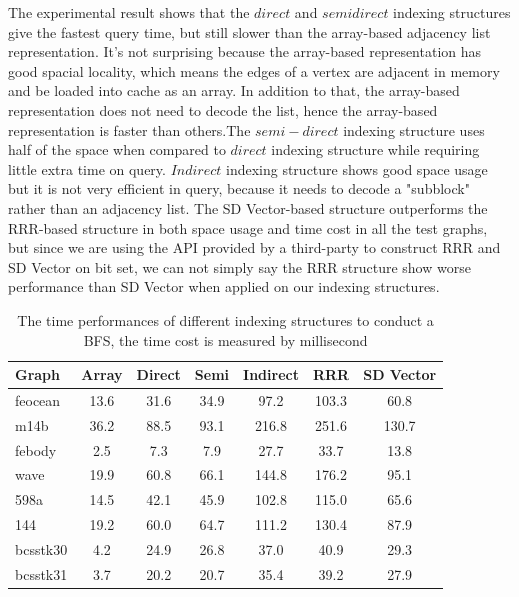 \documentclass[12pt,glossary]{dalthesis}
\begin{document}
The experimental result shows that the $direct$ and $semi direct$ indexing structures give the fastest query time, but still slower than the array-based adjacency list representation. It's not surprising because the array-based representation has good spacial locality, which means the edges of a vertex are adjacent in memory and be loaded into cache as an array. In addition to that, the array-based representation does not need to decode the list, hence the array-based representation is faster than others.The $semi-direct$ indexing structure uses half of the space when compared to $direct$ indexing structure while requiring little extra time on query. $Indirect$ indexing structure shows good space usage but it is not very efficient in query, because it needs to decode a "subblock" rather than an adjacency list. The SD Vector-based structure outperforms the RRR-based structure in both space usage and time cost in all the test graphs, but since we are using the API provided by a third-party to construct RRR and SD Vector on bit set, we can not simply say the RRR structure show worse performance than SD Vector when applied on our indexing structures.     

\bigskip

\begin{table}[ht]
\centering
\caption{The time performances of different indexing structures to conduct a BFS, the time cost is measured by millisecond}
\label{my-label}
\begin{tabular}{|l||c||c||c||c||c||c|}
\hline
Graph    & Array & Direct & Semi & Indirect & RRR & SD Vector \\ \hline
feocean  &   13.6    &   31.6     &   34.9   &    97.2      &  103.3   & 60.8          \\
m14b     &   36.2    &    88.5    &   93.1   &   216.8   &  251.6   &   130.7        \\
febody   &   2.5    &    7.3    &   7.9   &     27.7    &   33.7  &     13.8      \\
wave     &    19.9   &    60.8    &   66.1   &    144.8     &   176.2  &   95.1        \\
598a     &    14.5   &    42.1    &   45.9   &    102.8     &  115.0   &    65.6       \\
144      &   19.2    &    60.0    &   64.7   &     111.2     &  130.4   &  87.9         \\
bcsstk30 &   4.2    &    24.9    &   26.8   &    37.0    &   40.9  &  29.3         \\
bcsstk31 &    3.7   &    20.2    &   20.7   &     35.4    &   39.2  &  27.9         \\ \hline
\end{tabular}
\end{table}
\end{document}
